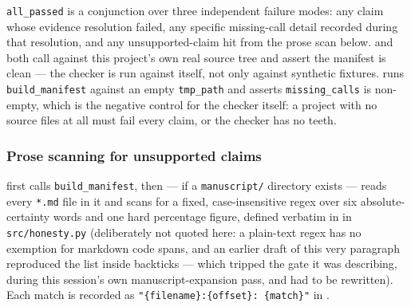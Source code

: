 \documentclass[
]{article}
\newcounter{none} %
\begin{document}
\texttt{all\_passed} is a conjunction over three independent failure
modes: any claim whose evidence resolution failed, any specific
missing-call detail recorded during that resolution, and any
unsupported-claim hit from the prose scan below.
 and
 both call
 against this project's own real
source tree and assert the manifest is clean --- the checker is run
against itself, not only against synthetic fixtures.
 runs
\texttt{build\_manifest} against an empty \texttt{tmp\_path} and asserts
\texttt{missing\_calls} is non-empty, which is the negative control for
the checker itself: a project with no source files at all must fail
every claim, or the checker has no teeth.

\subsubsection{Prose scanning for unsupported
claims}\label{prose-scanning-for-unsupported-claims}

 first
calls \texttt{build\_manifest}, then --- if a \texttt{manuscript/}
directory exists --- reads every \texttt{*.md} file in it and scans for
a fixed, case-insensitive regex over six absolute-certainty words and
one hard percentage figure, defined verbatim in
 in \texttt{src/honesty.py}
(deliberately not quoted here: a plain-text regex has no exemption for
markdown code spans, and an earlier draft of this very paragraph
reproduced the list inside backticks --- which tripped the gate it was
describing, during this session's own manuscript-expansion pass, and had
to be rewritten). Each match is recorded as
\texttt{"\{filename\}:\{offset\}:\ \textquotesingle{}\{match\}\textquotesingle{}"}
in .
\end{document}

